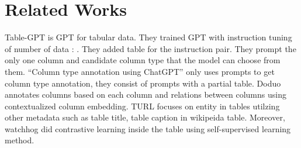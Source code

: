\section{Related Works}
Table-GPT is GPT for tabular data. They trained GPT with instruction tuning of
number of data : . They added table for the instruction pair. They prompt the
only one column and candidate column type that the model can choose from them.
``Column type annotation using ChatGPT'' only uses prompts to get column type
annotation, they consist of prompts with a partial table. Doduo annotates
columns based on each column and relations between columns using contextualized
column embedding. TURL focuses on entity in tables utilzing other metadata such
as table title, table caption in wikipeida table. Moreover, watchhog did
contrastive learning inside the table using self-supervised learning method.